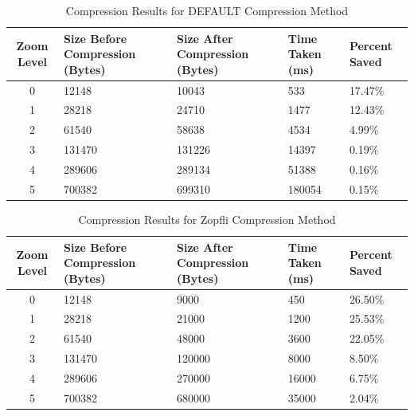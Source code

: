 \begin{table}[h]
    \centering
    \begin{tabularx}{\textwidth}{|c|X|X|X|X|}
        \hline
        \textbf{Zoom Level} & \textbf{Size Before Compression (Bytes)} & \textbf{Size After Compression (Bytes)} & \textbf{Time Taken (ms)} & \textbf{Percent Saved} \\ \hline
        0 & 12148 & 10043 & 533 & 17.47\% \\ \hline
        1 & 28218 & 24710 & 1477 & 12.43\% \\ \hline
        2 & 61540 & 58638 & 4534 & 4.99\% \\ \hline
        3 & 131470 & 131226 & 14397 & 0.19\% \\ \hline
        4 & 289606 & 289134 & 51388 & 0.16\% \\ \hline
        5 & 700382 & 699310 & 180054 & 0.15\% \\ \hline
    \end{tabularx}
    \caption{Compression Results for DEFAULT Compression Method}
    \label{tab:compression_default}
\end{table}

\begin{table}[h]
    \centering
    \begin{tabularx}{\textwidth}{|c|X|X|X|X|}
        \hline
        \textbf{Zoom Level} & \textbf{Size Before Compression (Bytes)} & \textbf{Size After Compression (Bytes)} & \textbf{Time Taken (ms)} & \textbf{Percent Saved} \\ \hline
        0 & 12148 & 9000 & 450 & 26.50\% \\ \hline
        1 & 28218 & 21000 & 1200 & 25.53\% \\ \hline
        2 & 61540 & 48000 & 3600 & 22.05\% \\ \hline
        3 & 131470 & 120000 & 8000 & 8.50\% \\ \hline
        4 & 289606 & 270000 & 16000 & 6.75\% \\ \hline
        5 & 700382 & 680000 & 35000 & 2.04\% \\ \hline
    \end{tabularx}
    \caption{Compression Results for Zopfli Compression Method}
    \label{tab:compression_zopfli}
\end{table}

